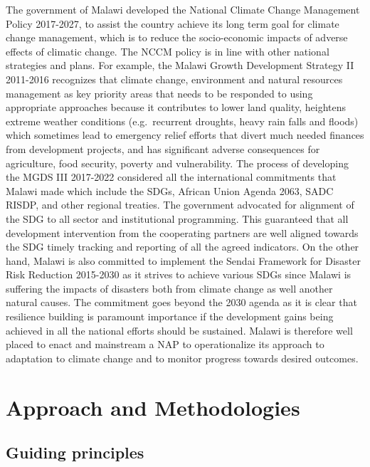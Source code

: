 \documentclass[
]{book}
\begin{document}
The government of Malawi developed the National Climate Change Management Policy 2017-2027, to assist the country achieve its long term goal for climate change
management, which is to reduce the socio-economic impacts of adverse effects of climatic change. The NCCM policy is in line with other national strategies and
plans. For example, the Malawi Growth Development Strategy II 2011-2016 recognizes that climate change, environment and natural resources management as key
priority areas that needs to be responded to using appropriate approaches because it contributes to lower land quality, heightens extreme weather conditions
(e.g.~recurrent droughts, heavy rain falls and floods) which sometimes lead to emergency relief efforts that divert much needed finances from development
projects, and has significant adverse consequences for agriculture, food security, poverty and vulnerability. The process of developing the MGDS III 2017-2022
considered all the international commitments that Malawi made which include the SDGs, African Union Agenda 2063, SADC RISDP, and other regional treaties. The
government advocated for alignment of the SDG to all sector and institutional programming. This guaranteed that all development intervention from the cooperating
partners are well aligned towards the SDG timely tracking and reporting of all the agreed indicators. On the other hand, Malawi is also committed to implement
the Sendai Framework for Disaster Risk Reduction 2015-2030 as it strives to achieve various SDGs since Malawi is suffering the impacts of disasters both from
climate change as well another natural causes. The commitment goes beyond the 2030 agenda as it is clear that resilience building is paramount importance if the
development gains being achieved in all the national efforts should be sustained. Malawi is therefore well placed to enact and mainstream a NAP to operationalize
its approach to adaptation to climate change and to monitor progress towards desired outcomes.

\hypertarget{approach-and-methodologies}{%
\chapter{Approach and Methodologies}\label{approach-and-methodologies}}

\hypertarget{guiding-principles}{%
\section{Guiding principles}\label{guiding-principles}}
\end{document}
